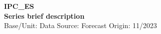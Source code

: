 \documentclass[a4paper,10pt]{article}
\begin{document}
\thispagestyle{empty}
\begin{landscape}
\begin{center}

\textbf{IPC_ES} \\ 

\textbf{Series brief description} \\ 

Base/Unit: 
\space \space \space Data Source:  
\space \space \space Forecast Origin: 11/2023 \\ 
\end{center}

\begin{footnotesize} \singlespacing  \end{footnotesize} 

\end{landscape}
\end{document}
